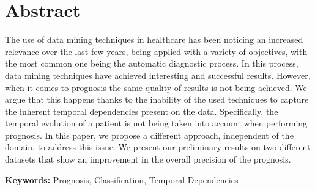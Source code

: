 
\section*{Abstract}


The use of data mining techniques in healthcare has been noticing an increased relevance over the last few years, being applied with a variety of objectives, with the most common one being the automatic diagnostic process. In this process, data mining techniques have achieved interesting and successful results. However, when it comes to prognosis the same quality of results is not being achieved. We argue that this happens thanks to the inability of the used techniques to capture the inherent temporal dependencies present on the data. Specifically, the temporal evolution of a patient is not being taken into account when performing prognosis. In this paper, we propose a different approach, independent of the domain, to address this issue. We present our preliminary results on two different datasets that show an improvement in the overall precision of the prognosis.

\vfill

\textbf{\Large Keywords:} Prognosis, Classification, Temporal Dependencies

\cleardoublepage

